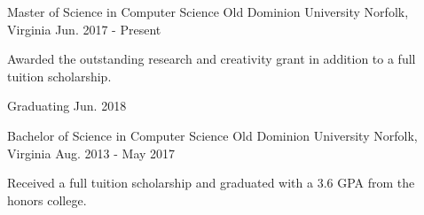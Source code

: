 \begin{cventries}
  \cventryz
    {Master of Science in Computer Science}
    {Old Dominion University}
    {Norfolk, Virginia}
    {Jun. 2017 - Present}
    {
      \begin{cvitems}
        \item {Awarded the outstanding research and creativity grant in addition to a full tuition scholarship.}
        \item {Graduating Jun. 2018}
      \end{cvitems}
    }
    \cventryx
    {Bachelor of Science in Computer Science}
    {Old Dominion University}
    {Norfolk, Virginia}
    {Aug. 2013 - May 2017}
    {
      \begin{cvitems}
        \item {Received a full tuition scholarship and graduated with a 3.6 GPA from the honors college.}
      \end{cvitems}
    }
\end{cventries}

